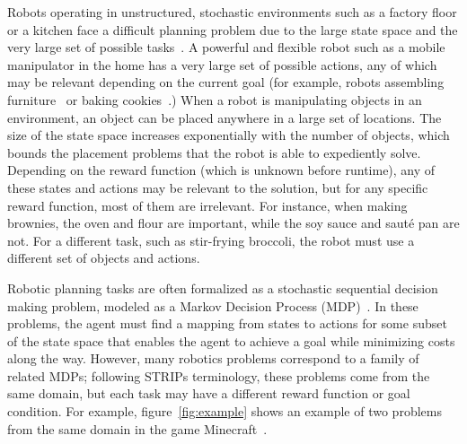 \documentclass[letterpaper]{article}
\begin{document}
Robots operating in unstructured, stochastic environments such as a
factory floor or a kitchen face a difficult planning problem due to
the large state space and the very large set of possible
tasks~\citep{bollini12,knepper13}.  A powerful and flexible robot such
as a mobile manipulator in the home has a very large set of possible
actions, any of which may be relevant depending on the current goal
(for example, robots assembling furniture~\citep{knepper13} or baking
cookies~\citep{bollini12}.)  When a robot is manipulating objects in
an environment, an object can be placed anywhere in a large set of
locations.  The size of the state space increases exponentially with
the number of objects, which bounds the placement problems that the
robot is able to expediently solve.  Depending on the reward function
(which is unknown before runtime), any of these states and actions may
be relevant to the solution, but for any specific reward function,
most of them are irrelevant.  For instance, when making brownies, the
oven and flour are important, while the soy sauce and saut\'{e} pan
are not.  For a different task, such as stir-frying broccoli, the
robot must use a different set of objects and
actions. 

Robotic planning tasks are often formalized as a stochastic sequential
decision making problem, modeled as a Markov Decision Process
(MDP)~\citep{thrun2008probabilistic}. In these problems, the agent
must find a mapping from states to actions for some subset of the
state space that enables the agent to achieve a goal while minimizing
costs along the way.  However, many robotics problems correspond to a
family of related MDPs; following STRIPs terminology, these problems
come from the same domain, but each task may have a different reward
function or goal condition.  For example, figure~\ref{fig:example}
shows an example of two problems from the same domain in the game
Minecraft~\citep{minecraft}.



\end{document}
